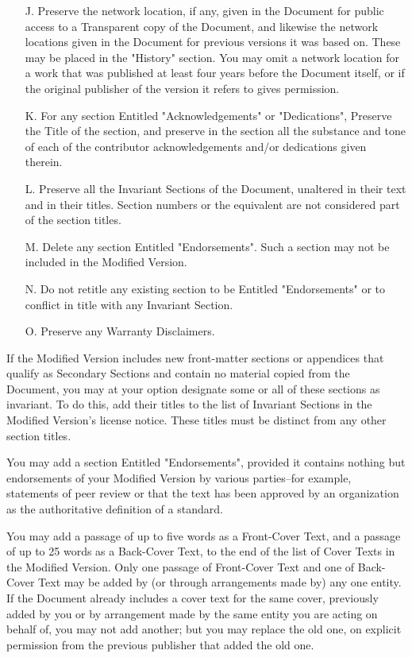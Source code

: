 \documentclass[a4paper,11pt]{article}
\begin{document}
\begin{itemize}
\item[J.]
   Preserve the network location, if any, given in the Document for
   public access to a Transparent copy of the Document, and likewise
   the network locations given in the Document for previous versions
   it was based on.  These may be placed in the "History" section.
   You may omit a network location for a work that was published at
   least four years before the Document itself, or if the original
   publisher of the version it refers to gives permission.
   
\item[K.]
   For any section Entitled "Acknowledgements" or "Dedications",
   Preserve the Title of the section, and preserve in the section all
   the substance and tone of each of the contributor acknowledgements
   and/or dedications given therein.
   
\item[L.]
   Preserve all the Invariant Sections of the Document,
   unaltered in their text and in their titles.  Section numbers
   or the equivalent are not considered part of the section titles.
   
\item[M.]
   Delete any section Entitled "Endorsements".  Such a section
   may not be included in the Modified Version.
   
\item[N.]
   Do not retitle any existing section to be Entitled "Endorsements"
   or to conflict in title with any Invariant Section.
   
\item[O.]
   Preserve any Warranty Disclaimers.
\end{itemize}

If the Modified Version includes new front-matter sections or
appendices that qualify as Secondary Sections and contain no material
copied from the Document, you may at your option designate some or all
of these sections as invariant.  To do this, add their titles to the
list of Invariant Sections in the Modified Version's license notice.
These titles must be distinct from any other section titles.

You may add a section Entitled "Endorsements", provided it contains
nothing but endorsements of your Modified Version by various
parties--for example, statements of peer review or that the text has
been approved by an organization as the authoritative definition of a
standard.

You may add a passage of up to five words as a Front-Cover Text, and a
passage of up to 25 words as a Back-Cover Text, to the end of the list
of Cover Texts in the Modified Version.  Only one passage of
Front-Cover Text and one of Back-Cover Text may be added by (or
through arrangements made by) any one entity.  If the Document already
includes a cover text for the same cover, previously added by you or
by arrangement made by the same entity you are acting on behalf of,
you may not add another; but you may replace the old one, on explicit
permission from the previous publisher that added the old one.
\end{document}
